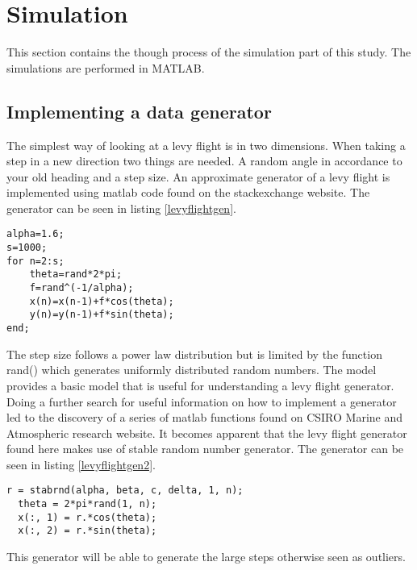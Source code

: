 \section{Simulation}
This section contains the though process of the simulation part of this study. The simulations are performed in MATLAB.

\subsection{Implementing a data generator}
The simplest way of looking at a levy flight is in two dimensions. When taking a step in a new direction two things are needed. A random angle in accordance to your old heading and a step size. An approximate generator of a levy flight is implemented using matlab code found on the stackexchange website\cite{firstlevy}. The generator can be seen in listing \ref{levyflightgen}.
\begin{lstlisting}[caption={Approximate levy flight generator},label=levyflightgen]
alpha=1.6;
s=1000;
for n=2:s;
    theta=rand*2*pi;
    f=rand^(-1/alpha);
    x(n)=x(n-1)+f*cos(theta);
    y(n)=y(n-1)+f*sin(theta);
end;
\end{lstlisting}
The step size follows a power law distribution but is limited by the function rand() which generates uniformly distributed random numbers. The model provides a basic model that is useful for understanding a levy flight generator.\\
Doing a further search for useful information on how to implement a generator led to the discovery of a series of matlab functions found on CSIRO Marine and Atmospheric research website\cite{betterlevy}. It becomes apparent that the levy flight generator found here makes use of stable random number generator\cite{stabrnd}. The generator can be seen in listing \ref{levyflightgen2}.  
\begin{lstlisting}[caption={Levy flight generator using a stable random number generator},label=levyflightgen2]
  r = stabrnd(alpha, beta, c, delta, 1, n);
  theta = 2*pi*rand(1, n);
  x(:, 1) = r.*cos(theta);
  x(:, 2) = r.*sin(theta);
\end{lstlisting}
This generator will be able to generate the large steps otherwise seen as outliers.

